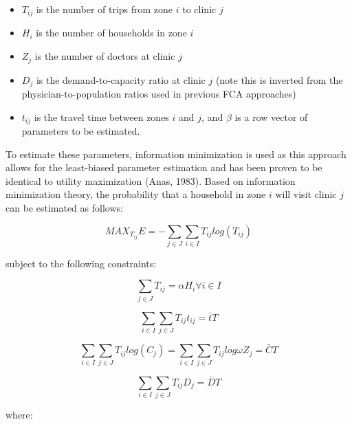 \documentclass[]{elsarticle} %
\providecommand{\tightlist}{%
  \setlength{\itemsep}{0pt}\setlength{\parskip}{0pt}}
\begin{document}
\begin{itemize}
\tightlist
\item
  \(T_{ij}\) is the number of trips from zone \(i\) to clinic \(j\)
\item
  \(H_i\) is the number of households in zone \(i\)
\item
  \(Z_j\) is the number of doctors at clinic \(j\)
\item
  \(D_j\) is the demand-to-capacity ratio at clinic \(j\) (note this is
  inverted from the physician-to-population ratios used in previous FCA
  approaches)
\item
  \(t_{ij}\) is the travel time between zones \(i\) and \(j\), and
  \(\beta\) is a row vector of parameters to be estimated.
\end{itemize}

To estimate these parameters, information minimization is used as this
approach allows for the least-biased parameter estimation and has been
proven to be identical to utility maximization (Anas, 1983). Based on
information minimization theory, the probability that a household in
zone \(i\) will visit clinic \(j\) can be estimated as follows:

\begin{equation}
\label{eq:mnl_MAX_T_ij}
MAX_{T_{ij}} E = -\sum_{j \in J} \sum_{i \in I} T_{ij} log(T_{ij})
\end{equation}

\noindent subject to the following constraints:

\begin{equation}
\label{eq:mnl_constraint1}
\sum_{j \in J}T_{ij} = \alpha H_i \forall i \in I
\end{equation}

\begin{equation}
\label{eq:mnl_constraint2}
\sum_{i \in I} \sum_{j \in J} T_{ij} t_{ij} = \bar{t}T
\end{equation}

\begin{equation}
\label{eq:mnl_constraint3}
\sum_{i \in I} \sum_{j \in J} T_{ij} log(C_j) = \sum_{i \in I} \sum_{j \in J}T_{ij} log \omega Z_j = \bar{C}T
\end{equation}

\begin{equation}
\label{eq:mnl_constraint4}
\sum_{i \in I} \sum_{j \in J} T_{ij} D_j = \bar{D}T
\end{equation}

\noindent where:
\end{document}
